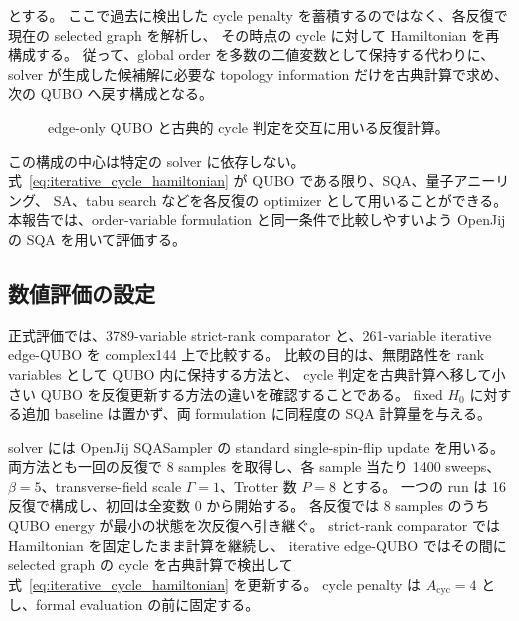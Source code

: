 とする。
ここで過去に検出した cycle penalty を蓄積するのではなく、各反復で現在の selected graph を解析し、
その時点の cycle に対して Hamiltonian を再構成する。
従って、global order を多数の二値変数として保持する代わりに、
solver が生成した候補解に必要な topology information だけを古典計算で求め、次の QUBO へ戻す構成となる。

\begin{figure}[tbp]
\centering
{}
\caption{edge-only QUBO と古典的 cycle 判定を交互に用いる反復計算。}
\label{fig:iterative_cycle_feedback}
\end{figure}

この構成の中心は特定の solver に依存しない。
式~\eqref{eq:iterative_cycle_hamiltonian} が QUBO である限り、SQA、量子アニーリング、
SA、tabu search などを各反復の optimizer として用いることができる。
本報告では、order-variable formulation と同一条件で比較しやすいよう OpenJij の SQA を用いて評価する。

\subsection{数値評価の設定}

正式評価では、3789-variable strict-rank comparator と、261-variable iterative edge-QUBO を
complex144 上で比較する。
比較の目的は、無閉路性を rank variables として QUBO 内に保持する方法と、
cycle 判定を古典計算へ移して小さい QUBO を反復更新する方法の違いを確認することである。
fixed $H_0$ に対する追加 baseline は置かず、両 formulation に同程度の SQA 計算量を与える。

solver には OpenJij SQASampler の standard single-spin-flip update を用いる。
両方法とも一回の反復で 8 samples を取得し、各 sample 当たり 1400 sweeps、
$\beta=5$、transverse-field scale $\Gamma=1$、Trotter 数 $P=8$ とする。
一つの run は 16 反復で構成し、初回は全変数 0 から開始する。
各反復では 8 samples のうち QUBO energy が最小の状態を次反復へ引き継ぐ。
strict-rank comparator では Hamiltonian を固定したまま計算を継続し、
iterative edge-QUBO ではその間に selected graph の cycle を古典計算で検出して
式~\eqref{eq:iterative_cycle_hamiltonian} を更新する。
cycle penalty は $A_{\mathrm{cyc}}=4$ とし、formal evaluation の前に固定する。

